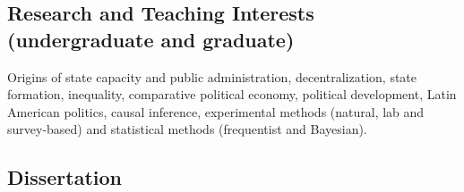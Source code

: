 \subsection*{Research and Teaching Interests (undergraduate and graduate)}

Origins of state capacity and public administration, decentralization, state formation, inequality, comparative political economy, political development, Latin American politics, causal inference, experimental methods (natural, lab and survey-based) and statistical methods (frequentist and Bayesian).

\subsection*{Dissertation}

	{\unskip}
